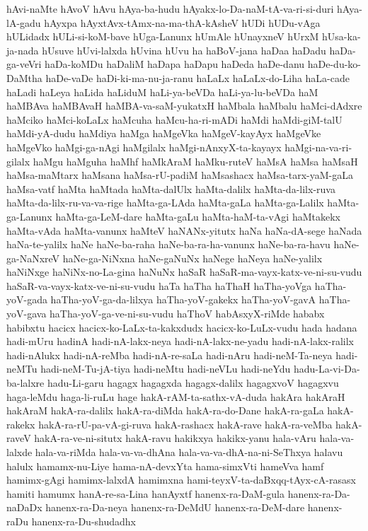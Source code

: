 {hAvi-naMte
hAvoV
hAvu
hAya-ba-hudu
hAyakx-lo-Da-naM-tA-va-ri-si-duri
hAya-lA-gadu
hAyxpa
hAyxtAvx-tAmx-na-ma-thA-kAsheV
hUDi
hUDu-vAga
hULidadx
hULi-si-koM-bave
hUga-Lanunx
hUmAle
hUnayxneV
hUrxM
hUsa-ka-ja-nada
hUsuve
hUvi-lalxda
hUvina
hUvu
ha
haBoV-jana
haDaa
haDadu
haDa-ga-veVri
haDa-koMDu
haDaliM
haDapa
haDapu
haDeda
haDe-danu
haDe-du-ko-DaMtha
haDe-vaDe
haDi-ki-ma-nu-ja-ranu
haLaLx
haLaLx-do-Liha
haLa-cade
haLadi
haLeya
haLida
haLiduM
haLi-ya-beVDa
haLi-ya-lu-beVDa
haM
haMBAva
haMBAvaH
haMBA-va-saM-yukatxH
haMbala
haMbalu
haMci-dAdxre
haMciko
haMci-koLaLx
haMcuha
haMcu-ha-ri-mADi
haMdi
haMdi-giM-talU
haMdi-yA-dudu
haMdiya
haMga
haMgeVka
haMgeV-kayAyx
haMgeVke
haMgeVko
haMgi-ga-nAgi
haMgilalx
haMgi-nAnxyX-ta-kayayx
haMgi-na-va-ri-gilalx
haMgu
haMguha
haMhf
haMkAraM
haMku-ruteV
haMsA
haMsa
haMsaH
haMsa-maMtarx
haMsana
haMsa-rU-padiM
haMsashacx
haMsa-tarx-yaM-gaLa
haMsa-vatf
haMta
haMtada
haMta-dalUlx
haMta-dalilx
haMta-da-lilx-ruva
haMta-da-lilx-ru-va-va-rige
haMta-ga-LAda
haMta-gaLa
haMta-ga-Lalilx
haMta-ga-Lanunx
haMta-ga-LeM-dare
haMta-gaLu
haMta-haM-ta-vAgi
haMtakekx
haMta-vAda
haMta-vanunx
haMteV
haNANx-yitutx
haNa
haNa-dA-sege
haNada
haNa-te-yalilx
haNe
haNe-ba-raha
haNe-ba-ra-ha-vanunx
haNe-ba-ra-havu
haNe-ga-NaNxreV
haNe-ga-NiNxna
haNe-gaNuNx
haNege
haNeya
haNe-yalilx
haNiNxge
haNiNx-no-La-gina
haNuNx
haSaR
haSaR-ma-vayx-katx-ve-ni-su-vudu
haSaR-va-vayx-katx-ve-ni-su-vudu
haTa
haTha
haThaH
haTha-yoVga
haTha-yoV-gada
haTha-yoV-ga-da-lilxya
haTha-yoV-gakekx
haTha-yoV-gavA
haTha-yoV-gava
haTha-yoV-ga-ve-ni-su-vudu
haThoV
habAsxyX-riMde
hababx
habibxtu
hacicx
hacicx-ko-LaLx-ta-kakxdudx
hacicx-ko-LuLx-vudu
hada
hadana
hadi-mUru
hadinA
hadi-nA-lakx-neya
hadi-nA-lakx-ne-yadu
hadi-nA-lakx-ralilx
hadi-nAlukx
hadi-nA-reMba
hadi-nA-re-saLa
hadi-nAru
hadi-neM-Ta-neya
hadi-neMTu
hadi-neM-Tu-jA-tiya
hadi-neMtu
hadi-neVLu
hadi-neYdu
hadu-La-vi-Da-ba-lalxre
hadu-Li-garu
hagagx
hagagxda
hagagx-dalilx
hagagxvoV
hagagxvu
haga-leMdu
haga-li-ruLu
hage
hakA-rAM-ta-sathx-vA-duda
hakAra
hakAraH
hakAraM
hakA-ra-dalilx
hakA-ra-diMda
hakA-ra-do-Dane
hakA-ra-gaLa
hakA-rakekx
hakA-ra-rU-pa-vA-gi-ruva
hakA-rashacx
hakA-rave
hakA-ra-veMba
hakA-raveV
hakA-ra-ve-ni-situtx
hakA-ravu
hakikxya
hakikx-yanu
hala-vAru
hala-va-lalxde
hala-va-riMda
hala-va-va-dhAna
hala-va-va-dhA-na-ni-SeThxya
halavu
halulx
hamamx-nu-Liye
hama-nA-devxYta
hama-simxVti
hameVva
hamf
hamimx-gAgi
hamimx-lalxdA
hamimxna
hami-teyxV-ta-daBxqq-tAyx-cA-rasasx
hamiti
hamumx
hanA-re-sa-Lina
hanAyxtf
hanenx-ra-DaM-gula
hanenx-ra-Da-naDaDx
hanenx-ra-Da-neya
hanenx-ra-DeMdU
hanenx-ra-DeM-dare
hanenx-raDu
hanenx-ra-Du-shudadhx
}
